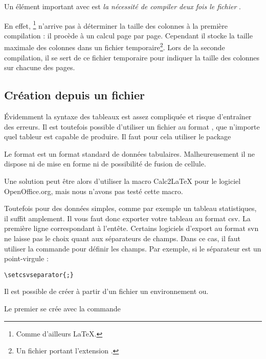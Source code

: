 Un élément important avec  est \emph{la nécessité de compiler deux fois le fichier }. 

En effet, \XeLaTeX{}\footnote{Comme d'ailleurs \LaTeX{}.} n'arrive pas à déterminer la taille des colonnes à la première compilation : il procède à un calcul page par page. Cependant il stocke la taille maximale des colonnes dans un fichier temporaire\footnote{Un fichier portant l'extension .}. Lors de la seconde compilation, il se sert de ce fichier temporaire pour indiquer la taille des colonnes sur chacune des pages.

\subsection{Création depuis un fichier }

Évidemment la syntaxe des tableaux est assez compliquée et risque d'entraîner des erreurs. Il est toutefois possible d'utiliser un fichier au format , que n'importe quel tableur est capable de produire. Il faut pour cela utiliser le package 

Le format  est un format standard de données tabulaires. Malheureusement il ne dispose ni de mise en forme ni de possibilité de fusion de cellule.

\begin{anedocte}Une solution peut être alors d'utiliser la macro Calc2LaTeX pour le logiciel OpenOffice.org, mais nous n'avons pas testé cette macro.
\end{anedocte}



Toutefois pour des données simples, comme par exemple un tableau statistiques, il suffit amplement. 
Il vous faut donc exporter votre tableau au format csv. La première ligne correspondant à l'entête. Certains logiciels d'export au format svn ne laisse pas le choix quant aux séparateurs de champs. Dans ce cas, il faut utiliser la commande  pour définir les champs. Par exemple, si le séparateur est un point-virgule :

\begin{verbatim}
\setcsvseparator{;}
\end{verbatim}
Il est possible de créer à partir d'un fichier  un environnement  ou.



Le premier se crée  avec la commande

